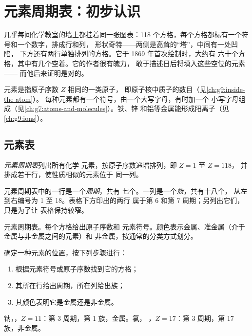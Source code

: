 \chapter{元素周期表：初步认识}\label{ch:g9:periodic-table-first-look}

几乎每间化学教室的墙上都挂着同一张图表：118
个方格，每个方格都标有一个符号和一个数字，排成行和列，
形状奇特——两侧是高耸的“塔”，中间有一处凹陷，
下方还有两行单独排列的方格。它于 1869 年首次绘制时，大约有
六十个方格，其中有几个空着。它的作者很有魄力，
敢于描述日后将填入这些空位的元素——
而他后来证明是对的。

\begin{recall}
元素是指原子序数 $Z$ 相同的一类原子，
即原子核中质子的数目（见\cref{ch:g9:inside-the-atom}）。
每种元素都有一个符号，由一个大写字母，有时加一个
小写字母组成（见\cref{ch:g7:atoms-and-molecules}）。铁、锌
和铝等金属能形成阳离子（见\cref{ch:g9:ions}）。
\end{recall}

\section{元素表}

\begin{definition}[元素周期表]\label{def:g9:periodic-table-first-look:periodic-table}
\emph{元素周期表}列出所有化学
元素，按原子序数递增排列，即 $Z = 1$ 至 $Z = 118$，
并排成若干行，使性质相似的元素位于
同一列。
\end{definition}

\begin{definition}[周期与族]\label{def:g9:periodic-table-first-look:period}
元素周期表中的一行是一个\emph{周期}，共有
七个。一列是一个\emph{族}，共有十八个，
从左到右编号为 1 至 18。表格下方印出的两行
属于第 6 和第 7 周期；另列出它们，只是为了让
表格保持较窄。
\end{definition}

\begin{omfigure}
\omperiodictable[colour=metals, legend=true, cell=0.86cm]

{\small 元素周期表。每个方格给出原子序数和
元素符号。颜色表示金属、准金属（介于金属与非金属之间的元素）和
非金属，按通常的分类方式划分。}
\end{omfigure}

\begin{method}[读懂元素周期表]\label{met:g9:periodic-table-first-look:read}
确定一种元素的位置，按下列步骤进行：
\begin{enumerate}
  \item 根据元素符号或原子序数找到它的方格；
  \item 其所在行给出周期，所在列给出族；
  \item 其颜色表明它是金属还是非金属。
\end{enumerate}
钠，，$Z = 11$：第 3 周期，第 1 族，金属。氯，
，$Z = 17$：第 3 周期，第 17 族，非金属。
\end{method}

